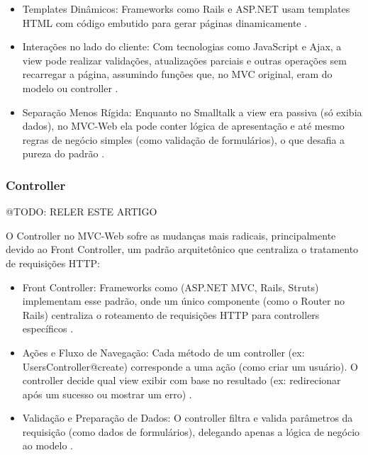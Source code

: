             \begin{itemize}
                \item Templates Dinâmicos: Frameworks como Rails e ASP.NET usam templates HTML com código embutido para gerar páginas dinamicamente \cite{inproceedings:grove:2011}.

                \item Interações no lado do cliente: Com tecnologias como JavaScript e Ajax, a view pode realizar validações, atualizações parciais e outras operações sem recarregar a página, assumindo funções que, no MVC original, eram do modelo ou controller \cite{inproceedings:grove:2011}.

                \item Separação Menos Rígida: Enquanto no Smalltalk a view era passiva (só exibia dados), no MVC-Web ela pode conter lógica de apresentação e até mesmo regras de negócio simples (como validação de formulários), o que desafia a pureza do padrão \cite{inproceedings:grove:2011}.
            \end{itemize}
        
       
        \subsubsection{Controller}
        \par @TODO: RELER ESTE ARTIGO
        
        \par O Controller no MVC-Web sofre as mudanças mais radicais, principalmente devido ao Front Controller, um padrão arquitetônico que centraliza o tratamento de requisições HTTP:

        \begin{itemize}
            \item Front Controller: Frameworks como (ASP.NET MVC, Rails, Struts) implementam esse padrão, onde um único componente (como o Router no Rails) centraliza o roteamento de requisições HTTP para controllers específicos \cite{inproceedings:grove:2011}.

            \item Ações e Fluxo de Navegação: Cada método de um controller (ex: UsersController@create) corresponde a uma ação (como criar um usuário). O controller decide qual view exibir com base no resultado (ex: redirecionar após um sucesso ou mostrar um erro) \cite{inproceedings:grove:2011}.

            \item Validação e Preparação de Dados: O controller filtra e valida parâmetros da requisição (como dados de formulários), delegando apenas a lógica de negócio ao modelo \cite{inproceedings:grove:2011}.            
        \end{itemize}